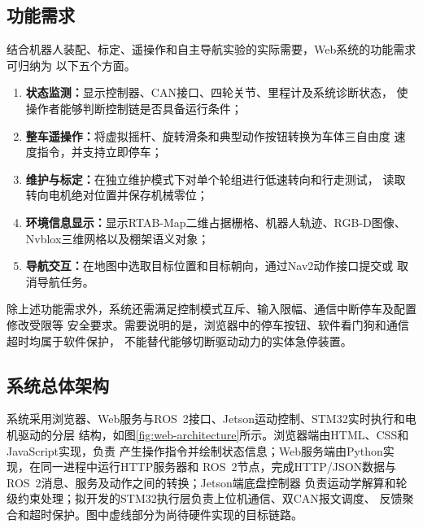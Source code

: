\documentclass[UTF8,12pt,a4paper,openany]{ctexbook}
\begin{document}
\subsection{功能需求}

结合机器人装配、标定、遥操作和自主导航实验的实际需要，Web系统的功能需求可归纳为
以下五个方面。

\begin{enumerate}
    \item \textbf{状态监测：}显示控制器、CAN接口、四轮关节、里程计及系统诊断状态，
          使操作者能够判断控制链是否具备运行条件；
    \item \textbf{整车遥操作：}将虚拟摇杆、旋转滑条和典型动作按钮转换为车体三自由度
          速度指令，并支持立即停车；
    \item \textbf{维护与标定：}在独立维护模式下对单个轮组进行低速转向和行走测试，
          读取转向电机绝对位置并保存机械零位；
    \item \textbf{环境信息显示：}显示RTAB-Map二维占据栅格、机器人轨迹、RGB-D图像、
          Nvblox三维网格以及棚架语义对象；
    \item \textbf{导航交互：}在地图中选取目标位置和目标朝向，通过Nav2动作接口提交或
          取消导航任务。
\end{enumerate}

除上述功能需求外，系统还需满足控制模式互斥、输入限幅、通信中断停车及配置修改受限等
安全要求。需要说明的是，浏览器中的停车按钮、软件看门狗和通信超时均属于软件保护，
不能替代能够切断驱动动力的实体急停装置。

\subsection{系统总体架构}

系统采用浏览器、Web服务与ROS~2接口、Jetson运动控制、STM32实时执行和电机驱动的分层
结构，如图\ref{fig:web-architecture}所示。浏览器端由HTML、CSS和JavaScript实现，负责
产生操作指令并绘制状态信息；Web服务端由Python实现，在同一进程中运行HTTP服务器和
ROS~2节点，完成HTTP/JSON数据与ROS~2消息、服务及动作之间的转换；Jetson端底盘控制器
负责运动学解算和轮级约束处理；拟开发的STM32执行层负责上位机通信、双CAN报文调度、
反馈聚合和超时保护。图中虚线部分为尚待硬件实现的目标链路。
\end{document}
